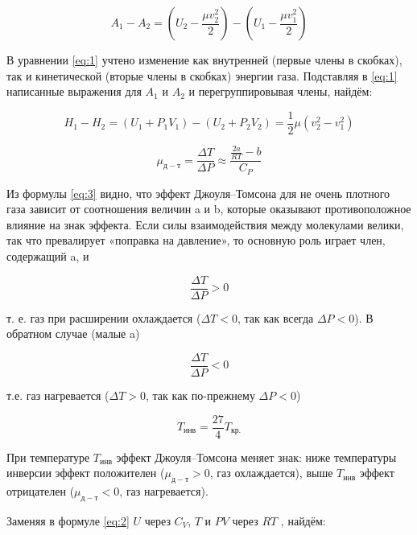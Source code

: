 \documentclass[a4paper, 12pt]{article}
\begin{document}
\begin{equation}
    A_1 - A_2 = \left(U_2 - \frac{\mu v_2^2}{2}\right) - \left(U_1 -  \frac{\mu v_1^2}{2}\right)
    \label{eq:1}
\end{equation}

В уравнении \eqref{eq:1} учтено изменение как внутренней (первые члены в скобках), так и кинетической (вторые члены в скобках) энергии газа. Подставляя в \eqref{eq:1} написанные выражения для $A_1$ и $A_2$ и перегруппировывая члены, найдём:

\begin{equation}
    H_1 - H_2 = \left(U_1 + P_1V_1\right) - \left(U_2 + P_2V_2\right) =  \frac{1}{2}\mu\left(v_2^2 - v_1^2\right)
    \label{eq:2}
\end{equation}

\begin{equation}
    \mu_{д-т} = \frac{\Delta T}{\Delta P} \approx \frac{\frac{2a}{RT} - b}{C_P}
    \label{eq:3}
\end{equation}

Из формулы \eqref{eq:3} видно, что эффект Джоуля–Томсона для не очень плотного газа зависит от соотношения величин a и b, которые оказывают противоположное влияние на знак эффекта. Если силы взаимодействия между молекулами велики, так что превалирует «поправка на давление», то основную роль играет член, содержащий a, и

\begin{equation*}
    \frac{\Delta T}{\Delta P} > 0
\end{equation*}

т. е. газ при расширении охлаждается ($\Delta T < 0$, так как всегда $\Delta P < 0$). В обратном случае (малые a)

\begin{equation*}
    \frac{\Delta T}{\Delta P} < 0
\end{equation*}

т.е. газ нагревается ($\Delta T > 0$, так как по-прежнему $\Delta P < 0$)

\begin{equation}
    T_{инв} = \frac{27}{4}T_{кр.}
\end{equation}

При температуре $T_{инв}$ эффект Джоуля–Томсона меняет знак: ниже температуры инверсии эффект положителен ($\mu_{д-т} > 0$, газ охлаждается), выше $T_{инв}$ эффект отрицателен ($\mu_{д-т} < 0$, газ нагревается).

Заменяя в формуле \eqref{eq:2} $U$ через $C_V$, $T$ и $PV$ через $RT$ , найдём:
\end{document}
